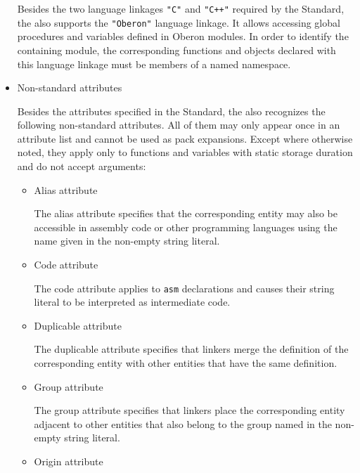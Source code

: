 \begin{itemize}
Besides the two language linkages \texttt{"C"} and \texttt{"C++"} required by the \cpp{} Standard, the \ecs{} also supports the \texttt{"Oberon"} language linkage.
It allows accessing global procedures and variables defined in Oberon modules.
In order to identify the containing module, the corresponding functions and objects declared with this language linkage must be members of a named namespace.
\seeoberon

\item Non-standard attributes 

Besides the attributes specified in the \cpp{} Standard, the \ecs{} also recognizes the following non-standard attributes.
All of them may only appear once in an attribute list and cannot be used as pack expansions.
Except where otherwise noted, they apply only to functions and variables with static storage duration and do not accept arguments:

\begin{itemize}

\item Alias attribute\alignright{}\nopagebreak

The alias attribute specifies that the corresponding entity may also be accessible in assembly code or other programming languages using the name given in the non-empty string literal.

\item Code attribute\alignright{}\nopagebreak

The code attribute applies to \texttt{asm} declarations and causes their string literal to be interpreted as intermediate code.
\seecode

\item Duplicable attribute\alignright{}\nopagebreak

The duplicable attribute specifies that linkers merge the definition of the corresponding entity with other entities that have the same definition.

\item Group attribute\alignright{}\nopagebreak

The group attribute specifies that linkers place the corresponding entity adjacent to other entities that also belong to the group named in the non-empty string literal.

\item Origin attribute\alignright{}\nopagebreak


\end{itemize}
\end{itemize}
